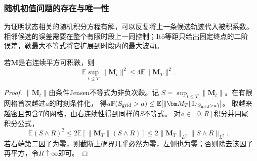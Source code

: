 \subsubsection{随机初值问题的存在与唯一性}
为证明状态相关的随机积分方程有解，可以反复将上一条候选轨迹代入被积系数。相邻候选的误差需要在整个有限时段上一同控制；Itô等距只给出固定终点的二阶误差，鞅最大不等式将它扩展到时段内的最大波动。
\begin{lemma}[二阶鞅最大不等式]
 \label{lem:action-state-doob-l2}
 若$\bm M$是右连续平方可积鞅，则
 \[
   \mathbb E\sup_{t\leq T}\|\bm M_t\|^2
      \leq4\mathbb E\|\bm M_T\|^2.
 \]
\end{lemma}
\begin{proof}
 $\|\bm M_t\|$由条件Jensen不等式为非负次鞅。记
 $S=\sup_{t\leq T}\|\bm M_t\|$。在有限网格首次越过$a$的时刻条件化，
 得$a\mathbb P(S_{\rm grid}>a)
 \leq\mathbb E[\|\bm M_T\|\mathbb I_{\{S_{\rm grid}>a\}}]$。
 取越来越密且包含$T$的网格，由右连续性得到同样的$S$不等式。
 对$a\in[0,R]$积分并用尾积分公式，
 \[
  \mathbb E(S\wedge R)^2
    \leq2\mathbb E[\|\bm M_T\|(S\wedge R)]
    \leq2\|\bm M_T\|_{L^2}\|S\wedge R\|_{L^2}.
 \]
 若右端第二因子为零，则截断上确界几乎必然为零，左侧也为零；否则除去该因子再平方，令$R\uparrow\infty$即可。
\end{proof}

